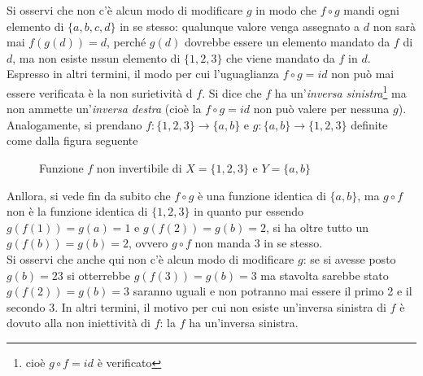\documentclass{book}
\theoremstyle{definition}
\theoremstyle{plain}
\begin{document}
Si osservi che non c'è alcun modo di modificare $g$ in modo che $f\circ g$ mandi ogni elemento di $\{a,b,c,d\}$ in
se stesso: qualunque valore venga assegnato a $d$ non sarà mai $f(g(d))=d$, perché $g(d)$ dovrebbe essere un elemento
mandato da $f$ di $d$, ma non esiste nssun elemento di $\{1,2,3\}$ che viene mandato da $f$ in $d$.\\
Espresso in altri termini, il modo per cui l'uguaglianza $f\circ g=id$ non può mai essere verificata è la non
surietività d $f$. Si dice che $f$ ha un'\textit{inversa sinistra}\footnote{cioè $g\circ f=id$ è verificato} ma non
ammette un'\textit{inversa destra} (cioè la $f\circ g=id$ non può valere per nessuna $g$). Analogamente, si prendano
$f:\{1,2,3\}\to \{a,b\}$ e $g:\{a,b\}\to \{1,2,3\}$ definite come dalla figura seguente
\begin{figure}[ht!]
  \centering
  \resizebox{15cm}{!}{}
  \caption{Funzione $f$ non invertibile di $X=\{1,2,3\}$ e $Y=\{a,b\}$}
\label{fig:Compinveeproddimatrici3}
\end{figure}

Anllora, si vede fin da subito che $f\circ g$ è una funzione identica di $\{a,b\}$, ma $g\circ f$ non è la funzione
identica di $\{1,2,3\}$ in quanto pur essendo $g(f(1))=g(a)=1$ e $g(f(2))=g(b)=2$, si ha oltre tutto un $g(f(b))=g(b)=2$,
ovvero $g\circ f$ non manda 3 in se stesso.\\
Si osservi che anche qui non c'è alcun modo di modificare $g$: se si avesse posto $g(b)=23$ si otterrebbe
$g(f(3))=g(b)=3$ ma stavolta sarebbe stato $g(f(2))=g(b)=3$ saranno uguali e non potranno mai essere il
primo 2 e il secondo 3. In altri termini, il motivo per cui non esiste un'inversa sinistra di $f$ è dovuto
alla non iniettività di $f$: la $f$ ha un'inversa sinistra.
\end{document}
